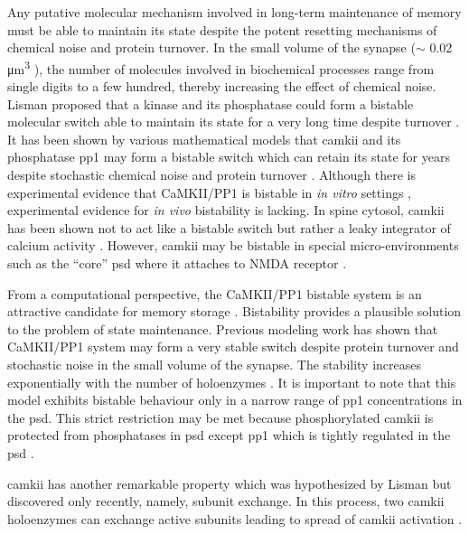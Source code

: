 \documentclass[9pt,lineno]{elife}
\begin{document}
Any putative molecular mechanism involved in long-term maintenance of memory
must be able to maintain its state despite the potent resetting mechanisms of
chemical noise and protein turnover.  In the small volume of the synapse ($\sim$
0.02 \si{\micro\meter^3} \citep{bartol_nanoconnectomic_2015}), the number of
molecules involved in biochemical processes range from single digits to a few
hundred, thereby increasing the effect of chemical noise.  Lisman proposed that
a kinase and its phosphatase could form a bistable molecular switch able to
maintain its state for a very long time despite turnover
\citep{lisman_mechanism_1985}. It has been shown by various mathematical models
that \gls{camkii} and its phosphatase \gls{pp1} may form a bistable switch
\citep{zhabotinsky_bistability_2000} which can retain its state for years
despite stochastic chemical noise and protein turnover
\citep{miller_stability_2005}. Although there is experimental evidence that
CaMKII/PP1 is bistable in \emph{in vitro} settings
\citep{bradshaw_ultrasensitive_2003,urakubo_vitro_2014}, experimental evidence
for \emph{in vivo} bistability is lacking. In spine cytosol, \gls{camkii} has
been shown not to act like a bistable switch but rather a leaky integrator of
calcium activity \citep{chang_camkii_2017}.  However, \gls{camkii} may be
bistable in special micro-environments such as the ``core'' \gls{psd} where it
attaches to NMDA receptor \citep{dosemeci_postsynaptic_2016,
petersen_distribution_2003}.

From a computational perspective, the CaMKII/PP1 bistable system is an attractive
candidate for memory storage \citep{koch_biophysics_2004}.  Bistability provides
a plausible solution to the problem of state maintenance. Previous modeling work
has shown that CaMKII/PP1 system may form a very stable switch despite protein
turnover and stochastic noise in the small volume of the synapse.  The stability
increases exponentially with the number of holoenzymes
\citep{miller_stability_2005}. It is important to note that this model exhibits
bistable behaviour only in a narrow range of \gls{pp1} concentrations in the
\gls{psd}. This strict restriction may be met because phosphorylated
\gls{camkii} is protected from phosphatases in \gls{psd} except \gls{pp1}
\citep{strack_differential_1997} which is tightly regulated in the \gls{psd}
\citep{bollen_extended_2010}. 

\gls{camkii} has another remarkable property which was hypothesized by Lisman
\citep{lisman_cam_1994} but discovered only recently, namely, subunit exchange.
In this process, two \gls{camkii} holoenzymes can exchange active subunits
leading to spread of \gls{camkii} activation \citep{stratton_activation-triggered_2014}.
\end{document}
